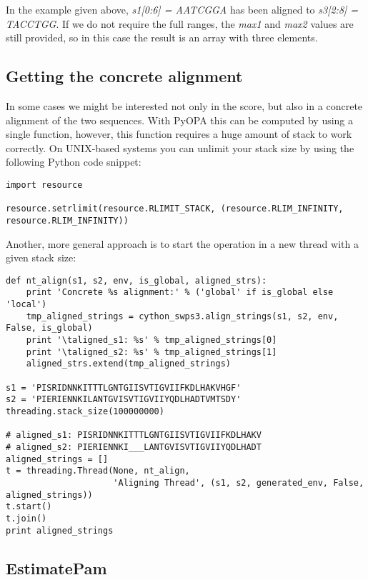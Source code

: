 \documentclass[12pt]{article}
\newcommand{\pp}{PyOPA}
\begin{document}
In the example given above, \emph{s1[0:6] = AATCGGA} has been aligned to \emph{s3[2:8] = TACCTGG}. If we do not require the full ranges, the \emph{max1} and \emph{max2} values are still provided, so in this case the result is an array with three elements.

\subsection{Getting the concrete alignment}
\label{subsec:concrete}

In some cases we might be interested not only in the score, but also in a concrete alignment of the two sequences. With \pp{} this can be computed by using a single function, however, this function requires a huge amount of stack to work correctly. On UNIX-based systems you can unlimit your stack size by using the following Python code snippet:
\begin{lstlisting}
import resource

resource.setrlimit(resource.RLIMIT_STACK, (resource.RLIM_INFINITY, resource.RLIM_INFINITY))
\end{lstlisting}

Another, more general approach is to start the operation in a new thread with a given stack size:

\begin{lstlisting}
def nt_align(s1, s2, env, is_global, aligned_strs):
    print 'Concrete %s alignment:' % ('global' if is_global else 'local')
    tmp_aligned_strings = cython_swps3.align_strings(s1, s2, env, False, is_global)
    print '\taligned_s1: %s' % tmp_aligned_strings[0]
    print '\taligned_s2: %s' % tmp_aligned_strings[1]
    aligned_strs.extend(tmp_aligned_strings)

s1 = 'PISRIDNNKITTTLGNTGIISVTIGVIIFKDLHAKVHGF'
s2 = 'PIERIENNKILANTGVISVTIGVIIYQDLHADTVMTSDY'
threading.stack_size(100000000)

# aligned_s1: PISRIDNNKITTTLGNTGIISVTIGVIIFKDLHAKV
# aligned_s2: PIERIENNKI___LANTGVISVTIGVIIYQDLHADT
aligned_strings = []
t = threading.Thread(None, nt_align,
                     'Aligning Thread', (s1, s2, generated_env, False, aligned_strings))
t.start()
t.join()
print aligned_strings
\end{lstlisting}

\subsection{EstimatePam}
\label{subsec:EPam}
\end{document}

